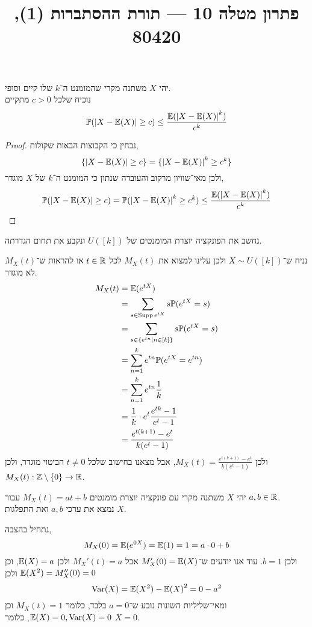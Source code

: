 
\title{פתרון מטלה 10 --- תורת ההסתברות (1), 80420}

\DeclareMathOperator{\Supp}{Supp}


\maketitle
\maketitleprint{}

\question{}
יהי $X$ משתנה מקרי שהמומנט ה־$k$ שלו קיים וסופי. \\
נוכיח שלכל $c > 0$ מתקיים
\[
	\mathbb{P}(|X - \mathbb{E}(X)| \ge c)
	\le \frac{\mathbb{E}({\left\lvert X - \mathbb{E}(X)\right\rvert}^k)}{c^k}
\]
\begin{proof}
	נבחין כי הקבוצות הבאות שקולות,
	\[
		\{ |X - \mathbb{E}(X)| \ge c \}
		= \{ {|X - \mathbb{E}(X)|}^k \ge c^k \}
	\]
	ולכן מאי־שוויון מרקוב והעובדה שנתון כי המומנט ה־$k$ של $X$ מוגדר,
	\[
		\mathbb{P}(|X - \mathbb{E}(X)| \ge c)
		= \mathbb{P}({|X - \mathbb{E}(X)|}^k \ge c^k)
		\le \frac{\mathbb{E}({|X - \mathbb{E}(X)|}^k)}{c^k}
	\]
\end{proof}

\question{}
נחשב את הפונקציה יוצרת המומנטים של $U([k])$ ונקבע את תחום הגדרתה.
\begin{solution}
	נניח ש־$X \sim U([k])$ ולכן עלינו למצוא את $M_X(t)$ לכל $t \in \mathbb{R}$ או להראות ש־$M_X(t)$ לא מוגדר.
	\begin{align*}
		M_X(t)
		& = \mathbb{E}(e^{t X}) \\
		& = \sum_{s \in \operatorname{Supp} e^{t X}} s \mathbb{P}(e^{t X} = s) \\
		& = \sum_{s \in \{ e^{tn} \mid n \in [k]\}} s \mathbb{P}(e^{t X} = s) \\
		& = \sum_{n = 1}^{k} e^{tn} \mathbb{P}(e^{tX} = e^{tn}) \\
		& = \sum_{n = 1}^{k} e^{tn} \frac{1}{k} \\
		& = \frac{1}{k} \cdot e^t \frac{e^{tk} - 1}{e^t - 1} \\
		& = \frac{e^{t(k + 1)} - e^t}{k(e^t - 1)}
	\end{align*}
	ולכן $M_X(t) = \frac{e^{t(k + 1)} - e^t}{k(e^t - 1)}$, אבל מצאנו בחישוב שלכל $t \ne 0$ הביטוי מוגדר, ולכן $M_X(t) : \mathbb{Z} \setminus \{ 0 \} \to \mathbb{R}$.
\end{solution}

\question{}
יהי $X$ משתנה מקרי עם פונקציה יוצרת מומנטים $M_X(t) = at + b$ עבור $a, b \in \mathbb{R}$. \\
נמצא את ערכי $a, b$ ואת התפלגות $X$.
\begin{solution}
	נתחיל בהצבה,
	\[
		M_X(0)
		= \mathbb{E}(e^{0X})
		= \mathbb{E}(1)
		= 1
		= a \cdot 0 + b
	\]
	ולכן $b = 1$.
	עוד אנו יודעים ש־$M_X'(0) = \mathbb{E}(X)$ אבל $M_X'(t) = a$ ולכן $\mathbb{E}(X) = a$, וכן $\mathbb{E}(X^2) = M_X''(0) = 0$ ולכן
	\[
		\operatorname{Var}(X)
		= \mathbb{E}(X^2) - {\mathbb{E}(X)}^2
		= 0 - a^2
	\]
	ומאי־שליליות השונות נובע ש־$a = 0$ בלבד, כלומר $M_X(t) = 1$ וכן $\mathbb{E}(X) = 0, \operatorname{Var}(X) = 0$, כלומר $X = 0$.
\end{solution}

